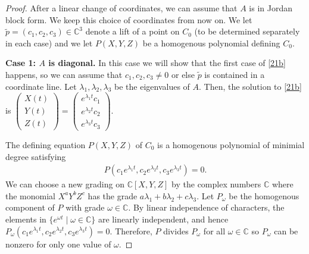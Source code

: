 \documentclass[11pt,reqno]{amsart}
\theoremstyle{plain}
\theoremstyle{definition}
\theoremstyle{remark}
\numberwithin{equation}{section}
\numberwithin{equation}{section}
\begin{document}
\begin{proof}
After a linear change of coordinates, we can assume that $A$ is in Jordan block form. We keep this choice of coordinates from now on. We let $\widetilde{p}=(c_1,c_2,c_3) \in \mathbb{C}^{3}$ denote a lift of a point on $C_{0}$ (to be determined separately in each case)  and we let $P(X,Y,Z)$ be a homogenous polynomial defining $C_0$.

\textbf{Case 1: $A$ is diagonal.} In this case we will show that the first case of \eqref{21b} happens, so we can assume that $c_1,c_2,c_3\neq 0$ or else $\widetilde{p}$ is contained in a coordinate line. Let $\lambda_1,\lambda_2,\lambda_3$ be the eigenvalues of $A$. Then, the solution to \eqref{21b} is $\begin{pmatrix} X(t) \\ Y(t) \\ Z(t)\end{pmatrix}=\begin{pmatrix} e^{\lambda_1 t} c_1 \\ e^{\lambda_2 t} c_2 \\ e^{\lambda_3 t} c_3\end{pmatrix}$.

The defining equation $P(X,Y,Z)$ of $C_{0}$ is a homogenous polynomial of minimial degree satisfying
\begin{align}
    P(c_1e^{\lambda_1 t},c_2e^{\lambda_2 t},c_3e^{\lambda_3 t})=0.
\end{align}
We can choose a new grading on  $\mathbb{C}[X,Y,Z]$ by the complex numbers $\mathbb{C}$ where the monomial $X^a Y^b Z^c$ has the grade $a\lambda_1+b\lambda_2+c\lambda_3$. Let $P_\omega$ be the homogenous component of $P$ with grade $\omega\in \mathbb{C}$. By linear independence of characters, the elements in $\{e^{\omega t} \mid \omega \in \mathbb{C}\}$ are linearly independent, and hence $P_{\omega}(c_1e^{\lambda_1 t},c_2e^{\lambda_2 t},c_3e^{\lambda_3 t})=0$. Therefore, $P$ divides $P_{\omega}$ for all $\omega\in \mathbb{C}$ so $P_{\omega}$ can be nonzero for only one value of $\omega$.


\end{proof}
\end{document}
